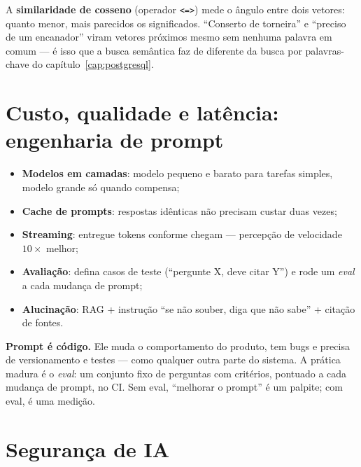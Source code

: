 \begin{caixaconceito}
A \textbf{similaridade de cosseno} (operador \texttt{<=>}) mede o ângulo entre
dois vetores: quanto menor, mais parecidos os significados. ``Conserto de
torneira'' e ``preciso de um encanador'' viram vetores próximos mesmo sem
nenhuma palavra em comum — é isso que a busca semântica faz de diferente da
busca por palavras-chave do capítulo~\ref{cap:postgresql}.
\end{caixaconceito}

\section{Custo, qualidade e latência: engenharia de prompt}

\begin{itemize}[leftmargin=*, itemsep=0.4em]
  \item \textbf{Modelos em camadas}: modelo pequeno e barato para tarefas simples, modelo grande só quando compensa;
  \item \textbf{Cache de prompts}: respostas idênticas não precisam custar duas vezes;
  \item \textbf{Streaming}: entregue tokens conforme chegam — percepção de velocidade $10\times$ melhor;
  \item \textbf{Avaliação}: defina casos de teste (``pergunte X, deve citar Y'') e rode um \emph{eval} a cada mudança de prompt;
  \item \textbf{Alucinação}: RAG + instrução ``se não souber, diga que não sabe'' + citação de fontes.
\end{itemize}

\begin{caixaconceito}
\textbf{Prompt é código.} Ele muda o comportamento do produto, tem bugs e
precisa de versionamento e testes — como qualquer outra parte do sistema. A
prática madura é o \emph{eval}: um conjunto fixo de perguntas com critérios,
pontuado a cada mudança de prompt, no CI. Sem eval, ``melhorar o prompt'' é
um palpite; com eval, é uma medição.
\end{caixaconceito}

\section{Segurança de IA}

